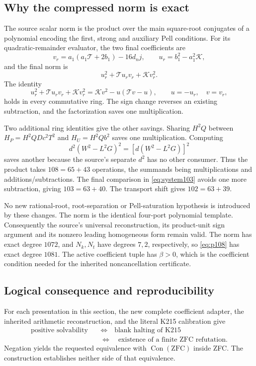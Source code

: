 \subsection{Why the compressed norm is exact}

The source scalar norm is the product over the main square-root conjugates
of a polynomial encoding the first, strong and auxiliary Pell conditions.
For its quadratic-remainder evaluator, the two final coefficients are
\[
 v_r=a_1(a_1\mathcal T+2b_1)-16d_nj,
 \qquad u_r=b_1^2-a_1^2\mathcal K,
\]
and the final norm is
\[
 u_r^2+\mathcal T u_rv_r+\mathcal K v_r^2.
\]
The identity
\begin{equation}
 u_r^2+\mathcal T u_rv_r+\mathcal K v_r^2
 =\mathcal K v^2-u(\mathcal T v-u),\qquad
 u=-u_r,\quad v=v_r,
 \label{eq:factored-positive-norm}
\end{equation}
holds in every commutative ring.  The sign change reverses an existing
subtraction, and the factorization saves one multiplication.

Two additional ring identities give the other savings.  Sharing $H^2Q$
between $H_P=H^2QDc^2T^2$ and $H_U=H^2Qb^2$ saves one multiplication.
Computing
\[
 d^2(W^2-L^2G)^2=[d(W^2-L^2G)]^2
\]
saves another because the source's separate $d^2$ has no other consumer.
Thus the product takes $108=65+43$ operations, the summands being
multiplications and additions/subtractions.  The final comparison in
\eqref{eq:system103} avoids one more subtraction, giving
$103=63+40$.  The transport shift gives $102=63+39$.

No new rational-root, root-separation or Pell-saturation hypothesis is
introduced by these changes.  The norm is the identical four-port
polynomial template.  Consequently the source's universal reconstruction,
its product-unit sign argument and its nonzero leading homogeneous form
remain valid.  The norm has exact degree $1072$, and $N_k,N_t$ have degrees
$7,2$, respectively, so \eqref{eq:p108} has exact degree $1081$.
The active coefficient tuple has $\beta>0$, which is the coefficient
condition needed for the inherited noncancellation certificate.

\subsection{Logical consequence and reproducibility}

For each presentation in this section, the new complete coefficient
adapter, the inherited arithmetic reconstruction, and the literal K215
calibration give
\begin{align*}
 \text{positive solvability}
 &\quad\Longleftrightarrow\quad \text{blank halting of K215}\\
 &\quad\Longleftrightarrow\quad \text{existence of a finite ZFC refutation}.
\end{align*}
Negation yields the requested equivalence with $\operatorname{Con}(\mathrm{ZFC})$
inside ZFC.  The construction establishes neither side of that equivalence.

